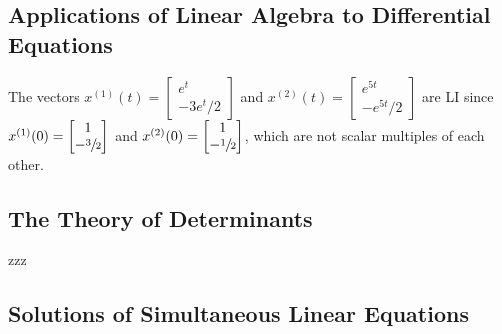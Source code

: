 \subsection{Applications of Linear Algebra to Differential Equations}
\begin{example}
    The vectors $x^{(1)}(t)=
    \begin{bmatrix}
        e^{t}\\
        -3e^{t} /2
    \end{bmatrix}$ and $x^{(2)}(t)=
    \begin{bmatrix}
        e^{5t}\\
        -e^{5t}/2
    \end{bmatrix}$ are LI since $x^{(1)}(0)=
    \begin{bmatrix}
        1\\
        -\sfrac{3}{2}
    \end{bmatrix}$ and $x^{(2)}(0)=
    \begin{bmatrix}
        1\\
        -\sfrac{1}{2}
    \end{bmatrix}$, which are not scalar multiples of each other.
\end{example}

\subsection{The Theory of Determinants}
zzz
\subsection{Solutions of Simultaneous Linear Equations}

